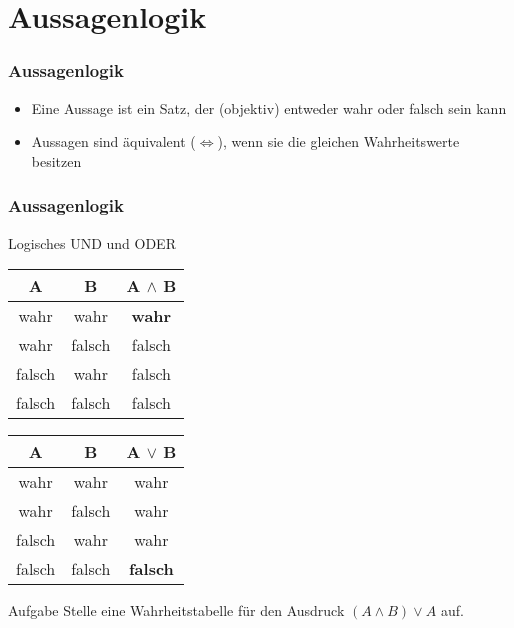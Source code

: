 \documentclass{beamer}
\begin{document}
\section{Aussagenlogik}
\begin{frame}
	\frametitle {Aussagenlogik}
	\begin{block}{}
		\begin{itemize}
			\item Eine Aussage ist ein Satz, der (objektiv) entweder wahr oder 					falsch sein kann
			\item Aussagen sind äquivalent (\(\Leftrightarrow\)), wenn sie die 					gleichen Wahrheitswerte besitzen
		\end{itemize}
	\end{block}
\end{frame}

\begin{frame}
	\frametitle {Aussagenlogik}
	\begin{block}{Logisches UND und ODER}
		\begin{center}
			\begin{tabular}{|c|c||c| }
				\hline
				A & B & A $\land$ B \\
				\hline
				wahr & wahr & \textbf{wahr}	\\
				\hline
				wahr & falsch & falsch \\
				\hline
				falsch & wahr & falsch \\
				\hline
				falsch & falsch & falsch \\
				\hline
			\end{tabular}
			\begin{tabular}{|c|c||c| }
				\hline
				A & B & A $\lor$ B \\
				\hline
				wahr & wahr & wahr \\
				\hline
				wahr & falsch & wahr \\
				\hline
				falsch & wahr & wahr \\
				\hline
				falsch & falsch & \textbf{falsch}	\\
				\hline
			\end{tabular}
		\end{center}
	\end{block}
	\pause	
	\begin{exampleblock}{Aufgabe}
		Stelle eine Wahrheitstabelle für den Ausdruck \((A\wedge B)\vee A\) auf.
	\end{exampleblock}
\end{frame}
\end{document}
